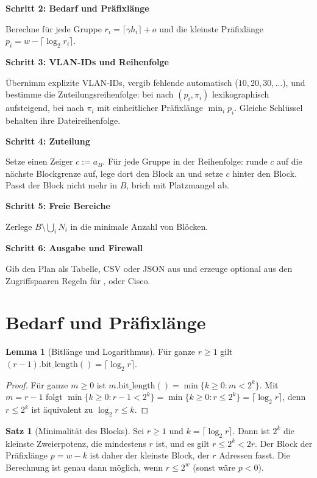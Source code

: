 \documentclass[a4paper,12pt, twoside]{report}
\theoremstyle{definition}
\newtheorem{satz}{Satz}
\newtheorem{lemma}{Lemma}
\newcommand{\code}[1]{\texttt{\detokenize{#1}}}
\begin{document}
\textbf{Schritt 2: Bedarf und Präfixlänge}

Berechne für jede Gruppe $r_i = \lceil\gamma h_i\rceil + o$ und die kleinste Präfixlänge $p_i = w - \lceil \log_2 r_i \rceil$.

\textbf{Schritt 3: VLAN-IDs und Reihenfolge}

Übernimm explizite VLAN-IDs, vergib fehlende automatisch ($10, 20, 30, \ldots$), und bestimme die Zuteilungsreihenfolge: bei \code{vlsm} nach $(p_i, \pi_i)$ lexikographisch aufsteigend, bei \code{fixed} nach $\pi_i$ mit einheitlicher Präfixlänge $\min_i p_i$. Gleiche Schlüssel behalten ihre Dateireihenfolge.

\textbf{Schritt 4: Zuteilung}

Setze einen Zeiger $c := a_B$. Für jede Gruppe in der Reihenfolge: runde $c$ auf die nächste Blockgrenze auf, lege dort den Block an und setze $c$ hinter den Block. Passt der Block nicht mehr in $B$, brich mit Platzmangel ab.

\textbf{Schritt 5: Freie Bereiche}

Zerlege $B \setminus \bigcup_i N_i$ in die minimale Anzahl von Blöcken.

\textbf{Schritt 6: Ausgabe und Firewall}

Gib den Plan als Tabelle, CSV oder JSON aus und erzeuge optional aus den Zugriffspaaren Regeln für \code{iptables}, \code{nftables} oder Cisco.

\section{Bedarf und Präfixlänge}

\begin{lemma}[Bitlänge und Logarithmus]
\label{lem:bitlen}
	Für ganze $r \ge 1$ gilt $(r-1).\mathrm{bit\_length}() = \lceil \log_2 r \rceil$.
\end{lemma}

\begin{proof}
	Für ganze $m \ge 0$ ist $m.\mathrm{bit\_length}() = \min\{k \ge 0 : m < 2^k\}$. Mit $m = r-1$ folgt $\min\{k \ge 0: r-1 < 2^k\} = \min\{k \ge 0 : r \le 2^k\} = \lceil \log_2 r \rceil$, denn $r \le 2^k$ ist äquivalent zu $\log_2 r \le k$.
\end{proof}

\begin{satz}[Minimalität des Blocks]
\label{satz:minimal}
	Sei $r \ge 1$ und $k = \lceil\log_2 r\rceil$. Dann ist $2^k$ die kleinste Zweierpotenz, die mindestens $r$ ist, und es gilt $r \le 2^k < 2r$. Der Block der Präfixlänge $p = w - k$ ist daher der kleinste Block, der $r$ Adressen fasst. Die Berechnung ist genau dann möglich, wenn $r \le 2^w$ (sonst wäre $p<0$).
\end{satz}
\end{document}
